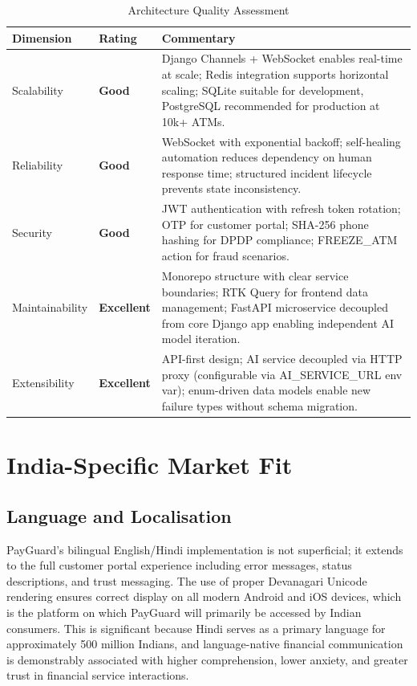 \documentclass[12pt,a4paper]{article}
\begin{document}
\begin{table}[H]
\centering
\caption{Architecture Quality Assessment}
\small
\begin{tabular}{@{}L{3.5cm} C{2cm} L{7.5cm}@{}}
\toprule
\textbf{Dimension} & \textbf{Rating} & \textbf{Commentary} \\
\midrule
Scalability & \textbf{Good} & Django Channels + WebSocket enables real-time at scale;
  Redis integration supports horizontal scaling; SQLite suitable for development,
  PostgreSQL recommended for production at 10k+ ATMs. \\
\addlinespace
Reliability & \textbf{Good} & WebSocket with exponential backoff; self-healing automation
  reduces dependency on human response time; structured incident lifecycle prevents state
  inconsistency. \\
\addlinespace
Security & \textbf{Good} & JWT authentication with refresh token rotation; OTP for customer
  portal; SHA-256 phone hashing for DPDP compliance; FREEZE\_ATM action for fraud scenarios. \\
\addlinespace
Maintainability & \textbf{Excellent} & Monorepo structure with clear service boundaries;
  RTK Query for frontend data management; FastAPI microservice decoupled from core Django
  app enabling independent AI model iteration. \\
\addlinespace
Extensibility & \textbf{Excellent} & API-first design; AI service decoupled via HTTP proxy
  (configurable via AI\_SERVICE\_URL env var); enum-driven data models enable new
  failure types without schema migration. \\
\bottomrule
\end{tabular}
\end{table}

\newpage

\section{India-Specific Market Fit}

\subsection{Language and Localisation}

PayGuard's bilingual English/Hindi implementation is not superficial; it extends to the
full customer portal experience including error messages, status descriptions, and trust
messaging. The use of proper Devanagari Unicode rendering ensures correct display on all
modern Android and iOS devices, which is the platform on which PayGuard will primarily be
accessed by Indian consumers. This is significant because Hindi serves as a primary language
for approximately 500 million Indians, and language-native financial communication is
demonstrably associated with higher comprehension, lower anxiety, and greater trust in
financial service interactions.
\end{document}
